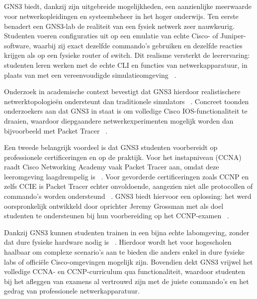 \vspace{0.3cm}

\subsection{}%
\label{sec:Functionaliteiten}

GNS3 biedt, dankzij zijn uitgebreide mogelijkheden, een aanzienlijke meerwaarde voor netwerkopleidingen en systeembeheer in het hoger onderwijs. Ten eerste benadert een GNS3-lab de realiteit van een fysiek netwerk zeer nauwkeurig. Studenten voeren configuraties uit op een emulatie van echte Cisco- of Juniper-software, waarbij zij exact dezelfde commando’s gebruiken en dezelfde reacties krijgen als op een fysieke router of switch. Dit realisme versterkt de leerervaring: studenten leren werken met de echte CLI en functies van netwerkapparatuur, in plaats van met een vereenvoudigde simulatieomgeving ~\autocite{Kuzmenko2016}.

\vspace{0.3cm}

Onderzoek in academische context bevestigt dat GNS3 hierdoor realistischere netwerktopologieën ondersteunt dan traditionele simulators ~\autocite{bakni2019}. Concreet toonden onderzoekers aan dat GNS3 in staat is om volledige Cisco IOS-functionaliteit te draaien, waardoor diepgaandere netwerkexperimenten mogelijk worden dan bijvoorbeeld met Packet Tracer ~\autocite{bakni2019}.

\vspace{0.3cm}

Een tweede belangrijk voordeel is dat GNS3 studenten voorbereidt op professionele certificeringen en op de praktijk. Voor het instapniveau (CCNA) raadt Cisco Networking Academy vaak Packet Tracer aan, omdat deze leeromgeving laagdrempelig is ~\autocite{gns3_docs2025}. Voor gevorderde certificeringen zoals CCNP en zelfs CCIE is Packet Tracer echter onvoldoende, aangezien niet alle protocollen of commando’s worden ondersteund ~\autocite{gns3_docs2025}. GNS3 biedt hiervoor een oplossing: het werd oorspronkelijk ontwikkeld door oprichter Jeremy Grossman met als doel studenten te ondersteunen bij hun voorbereiding op het CCNP-examen ~\autocite{gns3_docs2025}.

\vspace{0.3cm}

Dankzij GNS3 kunnen studenten trainen in een bijna echte labomgeving, zonder dat dure fysieke hardware nodig is ~\autocite{gns3_docs2025}. Hierdoor wordt het voor hogescholen haalbaar om complexe scenario’s aan te bieden die anders enkel in dure fysieke labs of officiële Cisco-omgevingen mogelijk zijn. Bovendien dekt GNS3 vrijwel het volledige CCNA- en CCNP-curriculum qua functionaliteit, waardoor studenten bij het afleggen van examens al vertrouwd zijn met de juiste commando’s en het gedrag van professionele netwerkapparatuur.

